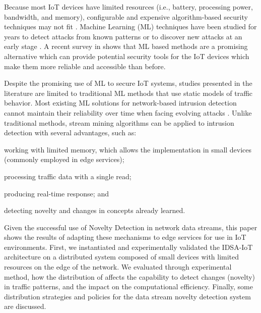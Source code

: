 Because most IoT devices have limited resources (i.e., battery, processing
power, bandwidth, and memory), configurable and expensive algorithm-based
security techniques may not fit \cite{Zhou2017}.
Machine Learning (ML) techniques have been studied for years to detect attacks
from known patterns or to discover new attacks at an early stage
\cite{buczak2016survey,mitchell2014survey}.
A recent survey in \cite{Tahsien2020} shows that ML based methods are a
promising alternative which can provide potential security tools for the IoT
devices which make them more reliable and accessible than before.

Despite the promising use of ML to secure IoT systems,
studies presented in the literature
\cite{buczak2016survey,mitchell2014survey,Tahsien2020}
are limited to
traditional ML methods that use static models of traffic behavior.
Most existing ML solutions for network-based intrusion detection cannot maintain
their reliability over time when facing evolving attacks \cite{Viegas2019}.
Unlike traditional methods, stream mining algorithms can be applied to intrusion
detection with several advantages, such as:
\begin{enumerate*}[label=(\emph{\roman*})]
    \item working with limited memory, which allows the implementation in small
    devices (commonly employed in edge services);
    \item processing traffic data with a single read;
    \item producing real-time response; and
    \item detecting novelty and changes in concepts already learned.
\end{enumerate*}

Given the successful
use of Novelty Detection in network data streams,
this paper shows the results of adapting these mechanisms to edge services
for use in IoT environments.
First, we instantiated and experimentally validated the IDSA-IoT
architecture \cite{Cassales2019a} on a distributed system
composed of small devices with limited resources on the edge of the network.
We evaluated through experimental method, how the distribution of
\minas
affects the capability to detect changes (novelty) in
traffic patterns, and the impact on the computational efficiency.
Finally, some distribution strategies and policies for the data stream
novelty detection system are discussed.

